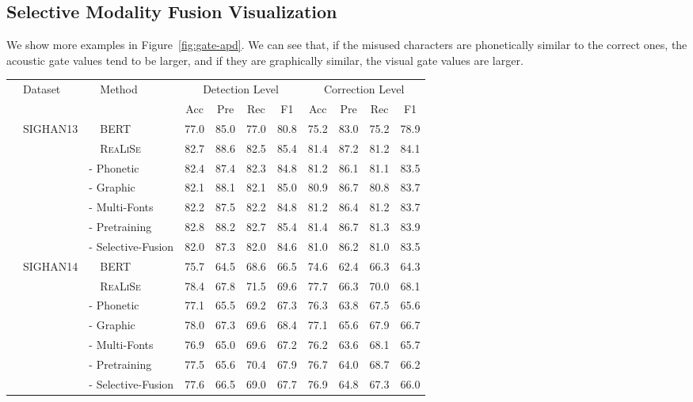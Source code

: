 \documentclass[11pt,a4paper]{article}
\newcommand\model{\textsc{ReaLiSe}}
\begin{document}
\subsection{Selective Modality Fusion Visualization}
\label{apd:fusion}
We show more examples in Figure~\ref{fig:gate-apd}. We can see that, if the misused characters are phonetically similar to the correct ones, the acoustic gate values tend to be larger, and if they are graphically similar, the visual gate values are larger.


\begin{table*}[t]
\centering

\begin{tabular}{@{}l|@{}l|cccc|cccc}
\toprule
\multirow{2}{*}{~~Dataset} & \multirow{2}{*}{~~Method} & \multicolumn{4}{c|}{Detection Level} & \multicolumn{4}{c}{Correction Level} \\
 & & Acc & Pre & Rec & F1 & Acc & Pre & Rec & F1 \\
\midrule

\multirow{7}{*}{~~SIGHAN13} & ~~BERT & 77.0 & 85.0 & 77.0 & 80.8 & 75.2 & 83.0 & 75.2 & 78.9 \\
& ~~\model{} & 82.7 & 88.6 & 82.5 & 85.4 & 81.4 & 87.2 & 81.2 & 84.1 \\
& \quad- Phonetic & 82.4 & 87.4 & 82.3 & 84.8 & 81.2 & 86.1 & 81.1 & 83.5 \\
& \quad- Graphic  & 82.1 & 88.1 & 82.1 & 85.0 & 80.9 & 86.7 & 80.8 & 83.7 \\
& \quad- Multi-Fonts & 82.2 & 87.5 & 82.2 & 84.8 & 81.2 & 86.4 & 81.2 & 83.7 \\
& \quad- Pretraining & 82.8 & 88.2 & 82.7 & 85.4 & 81.4 & 86.7 & 81.3 & 83.9 \\
& \quad- Selective-Fusion & 82.0 & 87.3 & 82.0 & 84.6 & 81.0 & 86.2 & 81.0 & 83.5  \\

\midrule

\multirow{7}{*}{~~SIGHAN14} & ~~BERT & 75.7 & 64.5 & 68.6 & 66.5 & 74.6 & 62.4 & 66.3 & 64.3 \\
& ~~\model{} & 78.4 & 67.8 & 71.5 & 69.6 & 77.7 & 66.3 & 70.0 & 68.1 \\
& \quad- Phonetic & 77.1 & 65.5 & 69.2 & 67.3 & 76.3 & 63.8 & 67.5 & 65.6 \\
& \quad- Graphic & 78.0 & 67.3 & 69.6 & 68.4 & 77.1 & 65.6 & 67.9 & 66.7 \\
& \quad- Multi-Fonts & 76.9 & 65.0 & 69.6 & 67.2 & 76.2 & 63.6 & 68.1 & 65.7 \\
& \quad- Pretraining & 77.5 & 65.6 & 70.4 & 67.9 & 76.7 & 64.0 & 68.7 & 66.2 \\
& \quad- Selective-Fusion & 77.6 & 66.5 & 69.0 & 67.7 & 76.9 & 64.8 & 67.3 & 66.0 \\


\end{tabular}
\end{table*}
\end{document}
